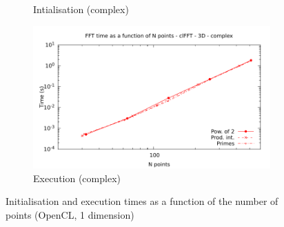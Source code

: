 \documentclass[12pt, a4paper]{article}
\begin{document}
\begin{figure}[H]
\begin{subfigure}{.5\textwidth}
\caption{Intialisation (complex)}
\label{FFTCL3DCI}
\end{subfigure}%
\begin{subfigure}{.5\textwidth}
\centering
\includegraphics[width=.9\linewidth]{graphs/fft-opencl-3d-pow2-c-exec.pdf}
\caption{Execution (complex)}
\label{FFTCL3DCE}
\end{subfigure}
\caption{Initialisation and execution times as a function of the number of points (OpenCL, 1 dimension)}
\label{FFTCL3D}
\end{figure}
\end{document}
